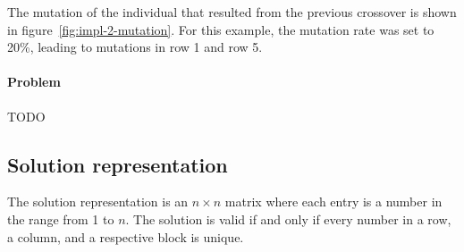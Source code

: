 The mutation of the individual that resulted from the previous crossover is shown in figure~\ref{fig:impl-2-mutation}. For this example, the mutation rate was set to 20\%, leading to mutations in row 1 and row 5. 

\paragraph{Problem} TODO

\subsection{Solution representation}
The solution representation is an $n \times n$ matrix where each entry is a number in the range from 1 to $n$. The solution is valid if and only if every number in a row, a column, and a respective block is unique.